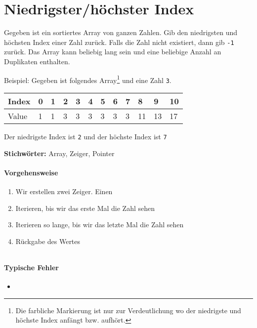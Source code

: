 \documentclass{book}
\begin{document}
\section{Niedrigster/höchster Index}
\begin{examplei}
	Gegeben ist ein sortiertes Array von ganzen Zahlen. Gib den niedrigsten und höchsten Index einer Zahl zurück. Falls die Zahl nicht existiert, dann gib \lstinline|-1| zurück. Das Array kann beliebig lang sein und eine beliebige Anzahl an Duplikaten enthalten.
	
	Beispiel:
	Gegeben ist folgendes Array\footnote{Die farbliche Markierung ist nur zur Verdeutlichung wo der niedrigste und höchste Index anfängt bzw. aufhört.} und eine Zahl \lstinline|3|. 	
	
	\begin{tabular}{|l|l|l|l|l|l|l|l|l|l|l|l|} 
		\hline
		Index & 0 & 1 & \cellcolor{yellow!25}2 & \cellcolor{yellow!25}3 & \cellcolor{yellow!25}4 & \cellcolor{yellow!25}5 & \cellcolor{yellow!25}6 & \cellcolor{yellow!25}7 & 8 & 9 & 10\\
		\hline
		Value & 1 & 1 & \cellcolor{blue!25}3 & \cellcolor{blue!25}3 & \cellcolor{blue!25}3 & \cellcolor{blue!25}3 & \cellcolor{blue!25}3 & \cellcolor{blue!25}3 & 11 & 13 & 17\\
		\hline
	\end{tabular}

	Der niedrigste Index ist \lstinline|2| und der höchste Index ist \lstinline|7|
\end{examplei}
{\bf Stichwörter:} Array, Zeiger, Pointer

\paragraph{Vorgehensweise}
\begin{enumerate} 
	\item Wir erstellen zwei Zeiger. Einen
	\item Iterieren, bis wir das erste Mal die Zahl sehen
	\item Iterieren so lange, bis wir das letzte Mal die Zahl sehen
	\item Rückgabe des Wertes
\end{enumerate}

\begin{lstlisting}[caption=My Javascript Example]

\end{lstlisting}

\paragraph{Typische Fehler}
\begin{itemize} 
	\item 
\end{itemize}
\end{document}
